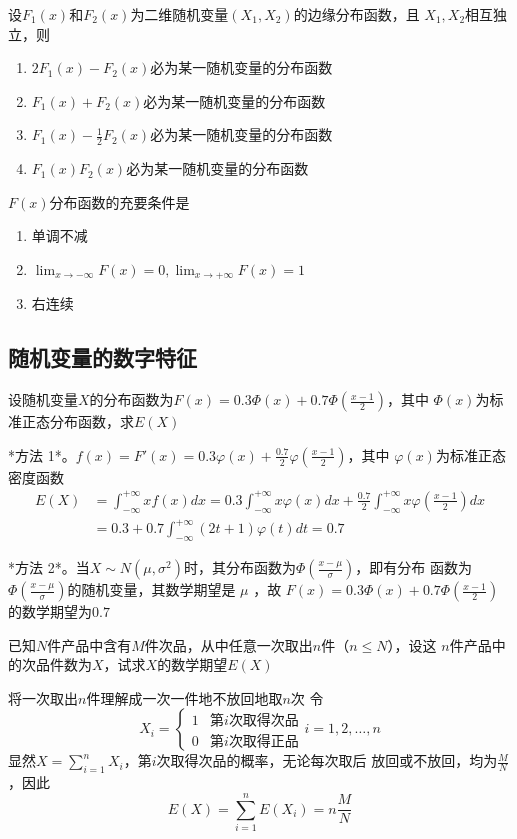 \documentclass{article}
\begin{document}
\begin{examplle}[]
设\(F_1(x)\)和\(F_2(x)\)为二维随机变量\((X_1,X_2)\)的边缘分布函数，且
\(X_1,X_2\)相互独立，则
\begin{enumerate}
\item \(2F_1(x)-F_2(x)\)必为某一随机变量的分布函数
\item \(F_1(x)+F_2(x)\)必为某一随机变量的分布函数
\item \(F_1(x)-\frac{1}{2}F_2(x)\)必为某一随机变量的分布函数
\item \(F_1(x)F_2(x)\)必为某一随机变量的分布函数
\end{enumerate}


\(F(x)\)分布函数的充要条件是
\begin{enumerate}
\item 单调不减
\item \(\displaystyle\lim_{x\to-\infty}F(x)=0,\lim_{x\to+\infty}F(x)=1\)
\item 右连续
\end{enumerate}
\end{examplle}
\subsection{随机变量的数字特征}
\label{sec:org5e67948}
\begin{examplle}[]
设随机变量\(X\)的分布函数为\(F(x)=0.3\Phi(x)+0.7\Phi(\frac{x-1}{2})\)，其中
\(\Phi(x)\)为标准正态分布函数，求\(E(X)\)

*方法 1*。\(f(x)=F'(x)=0.3\varphi(x)+\frac{0.7}{2}\varphi(\frac{x-1}{2})\)，其中
 \(\varphi(x)\)为标准正态密度函数
\begin{align*}
E(X)&=\int_{-\infty}^{+\infty}xf(x)dx=0.3\int_{-\infty}^{+\infty}x\varphi(x)dx+
\frac{0.7}{2}\int_{-\infty}^{+\infty}x\varphi(\frac{x-1}{2})dx\\
&=0.3+0.7\int_{-\infty}^{+\infty}(2t+1)\varphi(t)dt=0.7
\end{align*}

*方法 2*。当\(X\sim N(\mu,\sigma^2)\)时，其分布函数为\(\Phi(\frac{x-\mu}{\sigma})\)，即有分布
 函数为\(\Phi(\frac{x-\mu}{\sigma})\)的随机变量，其数学期望是 \(\mu\) ，故
 \(F(x)=0.3\Phi(x)+0.7\Phi(\frac{x-1}{2})\)的数学期望为\(0.7\)
\end{examplle}

\begin{examplle}[]
已知\(N\)件产品中含有\(M\)件次品，从中任意一次取出\(n\)件（\(n\le N\)），设这
\(n\)件产品中的次品件数为\(X\)，试求\(X\)的数学期望\(E(X)\)

将一次取出\(n\)件理解成一次一件地不放回地取\(n\)次
令
\begin{equation*}
X_i=
\begin{cases}
1&\text{第$i$次取得次品}\\
0&\text{第$i$次取得正品}
\end{cases}
i=1,2,\dots,n
\end{equation*}
显然\(X=\displaystyle\sum_{i=1}^nX_i\)，第\(i\)次取得次品的概率，无论每次取后
放回或不放回，均为\(\frac{M}{N}\)，因此
\begin{equation*}
E(X)=\sum_{i=1}^nE(X_i)=n\frac{M}{N}
\end{equation*}
\end{examplle}
\end{document}
